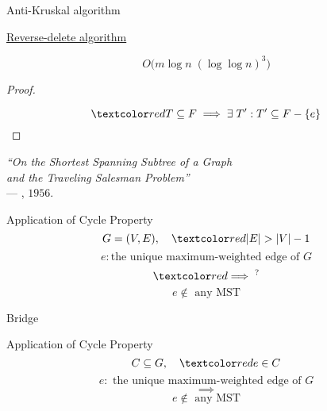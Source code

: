 \begin{frame}{}
  \begin{exampleblock}{Anti-Kruskal algorithm }
    \centerline{\href{https://en.wikipedia.org/wiki/Reverse-delete_algorithm}{Reverse-delete algorithm }}
  \end{exampleblock}

  \pause
  \[
    O\Big(m \log n\; (\log \log n)^3\Big)
  \]

  \pause
  \begin{proof}
    \centerline{}
    \pause
    \[
      \red{T \subseteq F \implies \exists\; T': T' \subseteq F - \set{e}}
    \]
  \end{proof}

  \pause
  \vspace{0.20cm}
  \begin{center}
    {\it ``On the Shortest Spanning Subtree of a Graph \\
    and the Traveling Salesman Problem''} \\
    \hfill --- , $1956$.
  \end{center}
\end{frame}

\begin{frame}{}
  \begin{exampleblock}{Application of Cycle Property }
    \[
      G = (V, E), \quad \red{|E| > |V| - 1}
    \]
    \[
      e: \text{the unique maximum-weighted edge of } G
    \]
    \[
      \red{\implies^{?}} 
    \]
    \[
      e \notin \text{ any MST}
    \]
  \end{exampleblock}

  \pause
  \vspace{0.60cm}
  \centerline{\large Bridge}
\end{frame}

\begin{frame}{}
  \begin{exampleblock}{Application of Cycle Property }
    \[
      C \subseteq G, \quad \red{e \in C}
    \]
    \[
      e: \text{ the unique maximum-weighted edge of } G
    \]
    \[
      \implies
    \]
    \[
      e \notin \text{ any MST}
    \]
  \end{exampleblock}

  \pause
  \vspace{0.50cm}
  \centerline{}
\end{frame}

